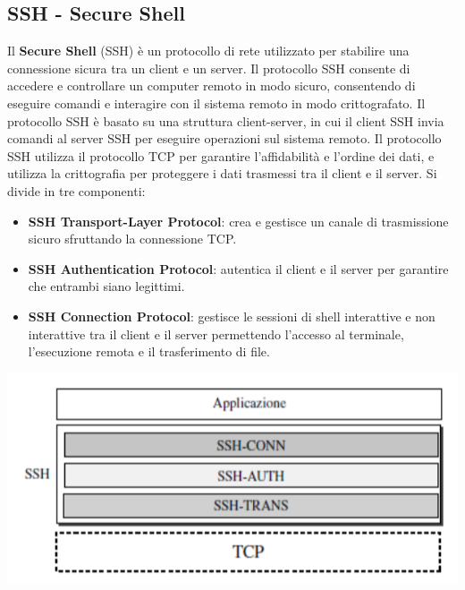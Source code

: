 \documentclass[12pt]{report}
\begin{document}
	\subsection{SSH - Secure Shell} 
	Il \textbf{Secure Shell} (SSH) è un protocollo di rete utilizzato per stabilire una connessione sicura tra un client e un server. Il protocollo SSH consente di accedere e controllare un computer remoto in modo sicuro, consentendo di eseguire comandi e interagire con il sistema remoto in modo crittografato. Il protocollo SSH è basato su una struttura client-server, in cui il client SSH invia comandi al server SSH per eseguire operazioni sul sistema remoto. Il protocollo SSH utilizza il protocollo TCP per garantire l'affidabilità e l'ordine dei dati, e utilizza la crittografia per proteggere i dati trasmessi tra il client e il server. Si divide in tre componenti:
	\begin{itemize}
		\item \textbf{SSH Transport-Layer Protocol}: crea e gestisce un canale di trasmissione sicuro sfruttando la connessione TCP.
		\item \textbf{SSH Authentication Protocol}: autentica il client e il server per garantire che entrambi siano legittimi.
		\item \textbf{SSH Connection Protocol}: gestisce le sessioni di shell interattive e non interattive tra il client e il server permettendo l'accesso al terminale, l'esecuzione remota e il trasferimento di file.
	\end{itemize}
	\begin{center}
		\includegraphics[scale=0.5]{assets/ssh.png}
	\end{center}
\end{document}

